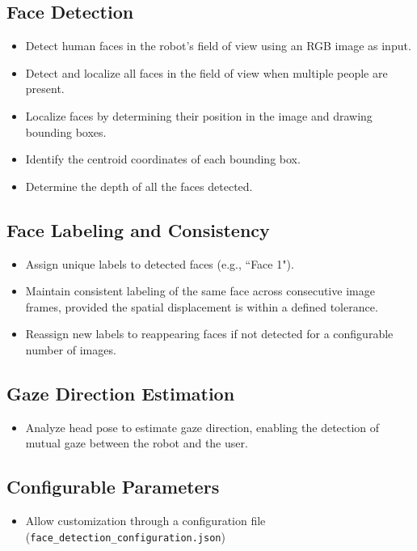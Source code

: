 \documentclass{CSSRforAfrica}
\begin{document}
\subsection*{Face Detection}
\begin{itemize}
	\item Detect human faces in the robot’s field of view using an RGB image as input.
	\item Detect and localize all faces in the field of view when multiple people are present.
	\item Localize faces by determining their position in the image and drawing bounding boxes.
	\item Identify the centroid coordinates of each bounding box.
	\item Determine the depth of all the faces detected.
\end{itemize}

\subsection*{Face Labeling and Consistency}
\begin{itemize}
	\item Assign unique labels to detected faces (e.g., ``Face 1").
	\item Maintain consistent labeling of the same face across consecutive image frames, provided the spatial displacement is within a defined tolerance.
	\item Reassign new labels to reappearing faces if not detected for a configurable number of images.
\end{itemize}

\subsection*{Gaze Direction Estimation}
\begin{itemize}
	\item Analyze head pose to estimate gaze direction, enabling the detection of mutual gaze between the robot and the user.
\end{itemize}

\subsection*{Configurable Parameters}
\begin{itemize}
	\item Allow customization through a configuration file (\texttt{face\_detection\_configuration.json})
\end{itemize}
\end{document}
